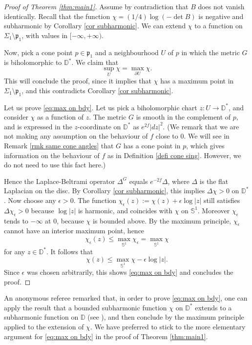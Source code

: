 \begin{proof}[Proof of Theorem \ref{thm:main1}]
Assume by contradiction that $B$ does not vanish identically. Recall that the function $\chi=(1/4)\log(-\det B)$ is negative and subharmonic by Corollary \ref{cor subharmonic}. We can extend $\chi$ to a function on $\Sigma_1\setminus \mathfrak p_1$, with values in $[-\infty,+\infty)$.

Now, pick a cone point $p\in\mathfrak p_1$ and a neighbourhood $U$ of $p$ in which the metric $G$ is biholomorphic to $\mathbb D^*$. We claim that
\begin{equation}\label{eq:max on bdy}
\sup_U \chi=\max_{\partial U}\chi.
\end{equation}
This will conclude the proof, since it implies that $\chi$ has a maximum point in $\Sigma_1\setminus \mathfrak p_1$, and this contradicts Corollary \ref{cor subharmonic}.

Let us prove \eqref{eq:max on bdy}. Let us pick a biholomorphic chart $z:U\to\mathbb D^*$, and consider $\chi$ as a function of $z$. The metric $G$ is {smooth in the complement of $p$, and is expressed in the $z$-coordinate on $\mathbb D^*$ as $e^{2f}|dz|^2$.} {(We remark that we are not making any assumption on the behaviour of $f$ close to $0$. We will see in Remark \ref{rmk same cone angles} that $G$ has a cone point in $p$, which gives information on the behaviour of $f$ as in Definition \ref{defi cone sing}. However, we do not need to use this fact here.)}

Hence the Laplace-Beltrami operator $\Delta^G$ equals $e^{-2f}\Delta$, where $\Delta$ is the flat Laplacian on the disc. By Corollary \ref{cor subharmonic}, this implies $\Delta\chi>0$ on $\mathbb D^*$. Now choose any $\epsilon>0$. The function $\chi_\epsilon(z):=\chi(z)+\epsilon\log|z|$ still satisfies $\Delta\chi_\epsilon>0$ because $\log|z|$ is harmonic, and coincides with $\chi$ on $\mathbb S^1$. Moreover $\chi_\epsilon$ tends to $-\infty$ at $0$, because $\chi$ is bounded above. By the maximum principle, $\chi_\epsilon$ cannot have an interior maximum point, hence
\[
\chi_\epsilon(z)\leq \max_{\mathbb S^1}\chi_\epsilon=\max_{\mathbb S^1}\chi
\]
for any $z\in \mathbb D^*$. It follows that
\[
\chi(z)\leq \max_{\mathbb S^1}\chi-\epsilon\log|z|.
\]
Since $\epsilon$ was chosen arbitrarily, this shows \eqref{eq:max on bdy} and concludes the proof.
\end{proof}

\begin{remark}\label{referee}
An anonymous referee remarked that, in order to prove \eqref{eq:max on bdy}, one can apply the result that a bounded subharmonic function $\chi$ on $\mathbb D^*$ extends to a subharmonic function on $\mathbb D$ (see \cite[Th.\,5.18]{zbMATH03652704}), and then conclude by the maximum principle applied to the extension of $\chi$.
We have preferred to stick to the more elementary argument for \eqref{eq:max on bdy} in the proof of Theorem \ref{thm:main1}.
\end{remark}

